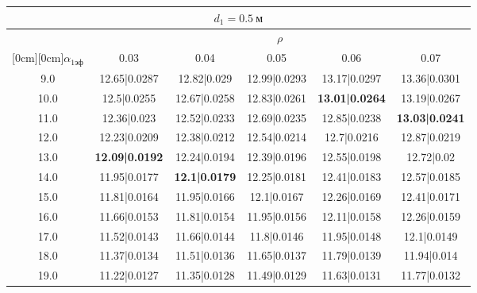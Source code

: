 \documentclass[20pt]{article}
\begin{document}
\begin{center}
\begin{tabular}{c|ccccc}
\hline
	\multicolumn{6}{c}{$d_{1}=0.5 \ м$} \\
\hline
	 & \multicolumn{5}{|c}{$\rho$} \\
	\cline{2-6}
	\raisebox{1.5ex}[0cm][0cm]{$\alpha_{1эф}$} & 0.03 & 0.04 & 0.05 & 0.06 & 0.07\\
\hline
	9.0 & 	12.65|0.0287 & 	12.82|0.029 & 	12.99|0.0293 & 	13.17|0.0297 & 	13.36|0.0301\\
	10.0 & 	12.5|0.0255 & 	12.67|0.0258 & 	12.83|0.0261 & 	\textbf{13.01|0.0264} & 	13.19|0.0267\\
	11.0 & 	12.36|0.023 & 	12.52|0.0233 & 	12.69|0.0235 & 	12.85|0.0238 & 	\textbf{13.03|0.0241}\\
	12.0 & 	12.23|0.0209 & 	12.38|0.0212 & 	12.54|0.0214 & 	12.7|0.0216 & 	12.87|0.0219\\
	13.0 & 	\textbf{12.09|0.0192} & 	12.24|0.0194 & 	12.39|0.0196 & 	12.55|0.0198 & 	12.72|0.02\\
	14.0 & 	11.95|0.0177 & 	\textbf{12.1|0.0179} & 	12.25|0.0181 & 	12.41|0.0183 & 	12.57|0.0185\\
	15.0 & 	11.81|0.0164 & 	11.95|0.0166 & 	12.1|0.0167 & 	12.26|0.0169 & 	12.41|0.0171\\
	16.0 & 	11.66|0.0153 & 	11.81|0.0154 & 	11.95|0.0156 & 	12.11|0.0158 & 	12.26|0.0159\\
	17.0 & 	11.52|0.0143 & 	11.66|0.0144 & 	11.8|0.0146 & 	11.95|0.0148 & 	12.1|0.0149\\
	18.0 & 	11.37|0.0134 & 	11.51|0.0136 & 	11.65|0.0137 & 	11.79|0.0139 & 	11.94|0.014\\
	19.0 & 	11.22|0.0127 & 	11.35|0.0128 & 	11.49|0.0129 & 	11.63|0.0131 & 	11.77|0.0132\\
\end{tabular}


\end{center}
\end{document}

